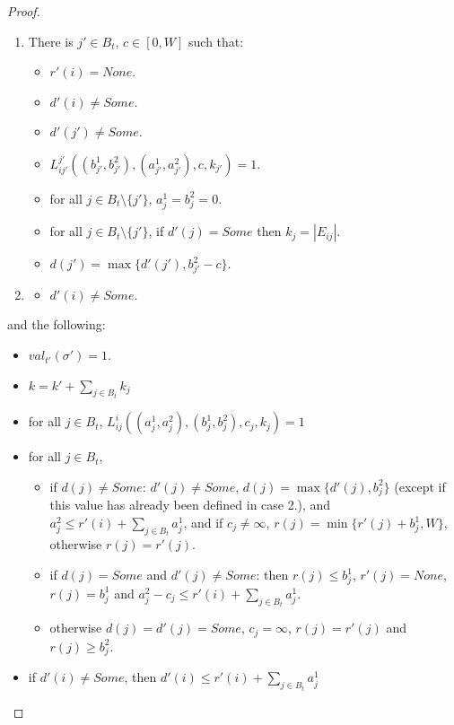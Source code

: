 \begin{proof}
\begin{lemma}
\begin{enumerate}
            \item There is $j'\in B_t$, $c\in [0,W]$ such that:
                \begin{itemize}
                \item $r'(i)=None$.
                \item $d'(i)\neq Some$.
                \item $d'(j')\neq Some$.
                \item $L_{ij'}^{j'}((b_{j'}^1,b_{j'}^2),(a_{j'}^1,a_{j'}^2),c,k_{j'})=1$.
                \item for all $j\in B_t\setminus \{j'\}$, $a_j^1=b_j^2=0$.
                \item for all $j\in B_t\setminus \{j'\}$, if $d'(j)=Some$ then $k_j=|E_{ij}|$.
                \item  $d(j')=\max\{d'(j'),b_{j'}^2-c\}$.
                \end{itemize}
            \item \begin{itemize}
                \item $d'(i)\neq Some$.
            \end{itemize}
        \end{enumerate}

        and the following:
        \begin{itemize}
            \item $val_{t'}(\sigma')=1$.
            \item $k=k'+\sum_{j\in B_t}k_j$
            \item for all $j\in B_t$, $L_{ij}^i((a_j^1,a_j^2),(b_j^1,b_j^2),c_j,k_j)=1$
            \item for all $j\in B_t$, \begin{itemize}
                \item if $d(j)\neq Some$: $d'(j)\neq Some$, $d(j)=\max\{d'(j),b_j^2\}$ (except if this value has already been defined in case 2.), and $a_j^2\leq r'(i)+\sum_{j\in B_t}a_{j}^1$, and if $c_j\neq \infty$, $r(j)=\min\{r'(j)+b_j^1,W\}$, otherwise $r(j)=r'(j)$.
                \item if $d(j)=Some$ and $d'(j)\neq Some$: then $r(j)\leq b_j^1$, $r'(j)=None$, $r(j)=b_j^1$ and $a_j^2-c_j\leq r'(i)+\sum_{j\in B_t}a_{j}^1$.
                \item otherwise $d(j)=d'(j)=Some$, $c_j=\infty$, $r(j)=r'(j)$ and $r(j)\geq b_j^2$.
                \end{itemize}
            \item if $d'(i)\neq Some$, then $d'(i)\leq r'(i)+\sum_{j\in B_t}a_{j}^1$
        \end{itemize}


\end{lemma}
\end{proof}
